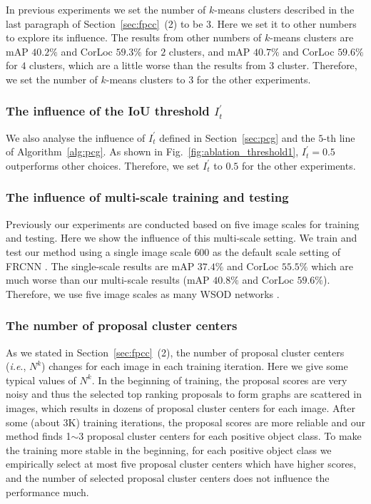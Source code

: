 \documentclass[10pt,journal,compsoc]{IEEEtran}
\def\ie{\emph{i.e}.} \def\Ie{\emph{I.e}.}
\begin{document}
In previous experiments we set the number of $k$-means clusters described in the last paragraph of Section~\ref{sec:fpcc}~(2) to be $3$.
Here we set it to other numbers to explore its influence.
The results from other numbers of $k$-means clusters are mAP $40.2\%$ and CorLoc $59.3\%$ for $2$ clusters,
and mAP $40.7\%$ and CorLoc $59.6\%$ for $4$ clusters,
which are a little worse than the results from $3$ cluster.
Therefore, we set the number of $k$-means clusters to $3$ for the other experiments.


\subsubsection{The influence of the IoU threshold $I^{\prime}_{t}$}
\label{sec:influence_it1}

We also analyse the influence of $I^{\prime}_{t}$ defined in Section~\ref{sec:pcg} and the $5$-th line of Algorithm~\ref{alg:pcg}.
As shown in Fig.~\ref{fig:ablation_threshold1}, $I^{\prime}_{t}=0.5$ outperforms other choices.
Therefore, we set $I^{\prime}_{t}$ to $0.5$ for the other experiments.


{
\subsubsection{The influence of multi-scale training and testing}
\label{sec:influence_scale}

Previously our experiments are conducted based on five image scales for training and testing.
Here we show the influence of this multi-scale setting.
We train and test our method using a single image scale $600$
as the default scale setting of FRCNN \cite{Ref:Girshick2015}.
The single-scale results are mAP $37.4\%$ and CorLoc $55.5\%$
which are much worse than our multi-scale results (mAP $40.8\%$ and CorLoc $59.6\%$).
Therefore, we use five image scales as many WSOD networks \cite{Ref:Diba2017,Ref:Bilen2016,Ref:Kantorov2016}.



\subsubsection{The number of proposal cluster centers}
\label{sec:nk}

As we stated in Section~\ref{sec:fpcc}~(2),
the number of proposal cluster centers (\ie, $N^{k}$)
changes for each image in each training iteration.
Here we give some typical values of $N^{k}$.
In the beginning of training,
the proposal scores are very noisy
and thus the selected top ranking proposals to form graphs are scattered in images,
which results in dozens of proposal cluster centers for each image.
After some (about 3K) training iterations,
the proposal scores are more reliable
and our method finds 1$\sim$3 proposal cluster centers for each positive object class.
To make the training more stable in the beginning,
for each positive object class we empirically select at most five proposal cluster centers which have higher scores,
and the number of selected proposal cluster centers does not influence the performance much.

}
\end{document}
